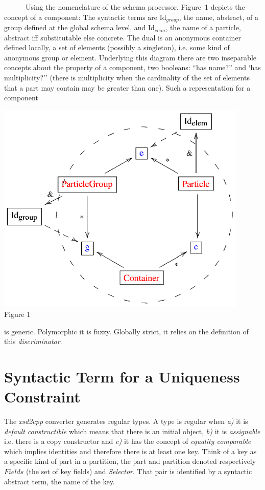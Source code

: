 \noindent
\begin{minipage}[h]{7.0cm}
~~~~~~Using the nomenclature of the schema processor, Figure~1 depicts the concept of a component: The syntactic terms are Id$_{group}$, the name, abstract, of a group defined at the global schema level, and Id$_{elem}$, the name of a particle, abstract iff substitutable else concrete. The dual is an anonymous container defined locally, a set of  elements (possibly a singleton), i.e. some kind of anonymous group or element. Underlying this diagram there are two inseparable concepts about the property of a component, two booleans: ``has name?'' and `has multiplicity?'' (there is multiplicity when the cardinality of the set of elements that a part may contain may be greater than one). Such a representation for a component
\end{minipage}
\begin{minipage}[h]{7.0cm}
 \begin{center}
 \includegraphics[width=0.9\textwidth]{part8/Viallefond_P52/P52_1.eps}
 \\\small{Figure 1}
 \end{center}

\end{minipage}
\hfill
 is generic. Polymorphic it is fuzzy. Globally strict, it relies on the definition of this 
{\it discriminator}.


\section{Syntactic Term for a Uniqueness Constraint} 
The {\it xsd2cpp} converter generates regular types. A type is regular when
{\it a)} it is  {\it default constructible} which means that there is an initial object,
{\it b)} it is {\it assignable} i.e. there is a copy constructor and 
{\it c)} it has the concept of  {\it equality comparable} which implies identities and therefore there is at least one key. Think of a  key as a specific kind of part in a partition, the part and partition denoted respectively $Fields$ (the set of key fields) and \textit{Selector}. That pair is identified by a syntactic abstract term, the name of the key.

